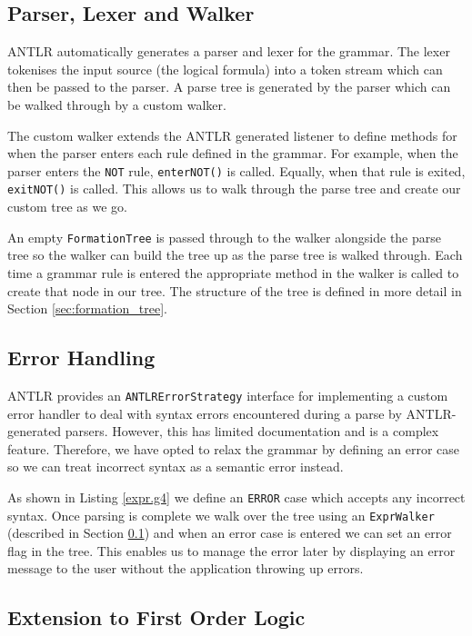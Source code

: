 \documentclass{report}
\begin{document}
\subsection{Parser, Lexer and Walker}
\label{sub:walker}

ANTLR automatically generates a parser and lexer for the grammar. The lexer tokenises the input source (the logical formula) into a token stream which can then be passed to the parser. A parse tree is generated by the parser which can be walked through by a custom walker. 

The custom walker extends the ANTLR generated listener to define methods for when the parser enters each rule defined in the grammar. For example, when the parser enters the {\tt NOT} rule, {\tt enterNOT()} is called. Equally, when that rule is exited, {\tt exitNOT()} is called. This allows us to walk through the parse tree and create our custom tree as we go.

An empty {\tt FormationTree} is passed through to the walker alongside the parse tree so the walker can build the tree up as the parse tree is walked through. Each time a grammar rule is entered the appropriate method in the walker is called to create that node in our tree. The structure of the tree is defined in more detail in Section \ref{sec:formation_tree}.

\subsection{Error Handling}
\label{sub:error_handling}

ANTLR provides an {\tt ANTLRErrorStrategy} interface for implementing a custom error handler to deal with syntax errors encountered during a parse by ANTLR-generated parsers. However, this has limited documentation and is a complex feature. Therefore, we have opted to relax the grammar by defining an error case so we can treat incorrect syntax as a semantic error instead.

As shown in Listing \ref{expr.g4} we define an {\tt ERROR} case which accepts any incorrect syntax. Once parsing is complete we walk over the tree using an {\tt ExprWalker} (described in Section \ref{sub:walker}) and when an error case is entered we can set an error flag in the tree. This enables us to manage the error later by displaying an error message to the user without the application throwing up errors.

\subsection{Extension to First Order Logic}
\end{document}
